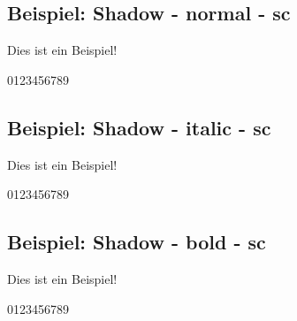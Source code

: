 \documentclass[ngerman]{libertinedoku}
\begin{document}
\subsection{Beispiel: Shadow - normal - sc}

{\fontsize{1.5cm}{1.6cm}\selectfont
Dies ist ein Beispiel!\par 0123456789\par}

\subsection{Beispiel: Shadow - italic - sc}

{\fontsize{1.5cm}{1.6cm}\selectfont
Dies ist ein Beispiel!\par 0123456789\par}

\subsection{Beispiel: Shadow - bold - sc}

{\fontsize{1.5cm}{1.6cm}\selectfont
Dies ist ein Beispiel!\par 0123456789\par}
\end{document}
